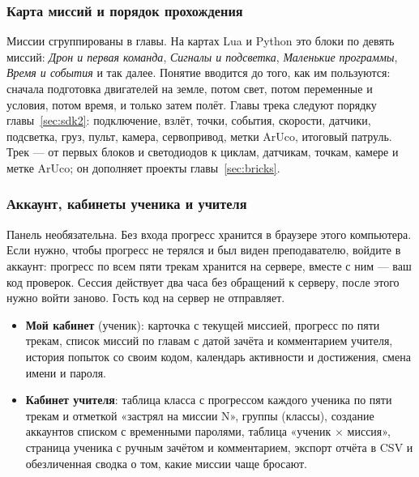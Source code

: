 \subsubsection{Карта миссий и порядок прохождения}

\begin{center}
\end{center}

\begin{center}
\end{center}

Миссии сгруппированы в главы. На картах Lua и Python это блоки по девять миссий: \textit{Дрон и первая команда}, \textit{Сигналы и подсветка}, \textit{Маленькие программы}, \textit{Время и события} и так далее. Понятие вводится до того, как им пользуются: сначала подготовка двигателей на земле, потом свет, потом переменные и условия, потом время, и только затем полёт. Главы трека  следуют порядку главы~\ref{sec:sdk2}: подключение, взлёт, точки, события, скорости, датчики, подсветка, груз, пульт, камера, сервопривод, метки ArUco, итоговый патруль. Трек  --- от первых блоков и светодиодов к циклам, датчикам, точкам, камере и метке ArUco; он дополняет проекты главы~\ref{sec:bricks}.

\subsubsection{Аккаунт, кабинеты ученика и учителя}

Панель  необязательна. Без входа прогресс хранится в браузере этого компьютера. Если нужно, чтобы прогресс не терялся и был виден преподавателю, войдите в аккаунт: прогресс по всем пяти трекам хранится на сервере, вместе с ним --- ваш код проверок. Сессия действует два часа без обращений к серверу, после этого нужно войти заново. Гость код на сервер не отправляет.

\begin{itemize}
    \item \textbf{Мой кабинет} (ученик): карточка  с текущей миссией, прогресс по пяти трекам, список миссий по главам с датой зачёта и комментарием учителя, история попыток со своим кодом, календарь активности и достижения, смена имени и пароля.
    \item \textbf{Кабинет учителя}: таблица класса с прогрессом каждого ученика по пяти трекам и отметкой «застрял на миссии N», группы (классы), создание аккаунтов списком с временными паролями, таблица «ученик $\times$ миссия», страница ученика с ручным зачётом и комментарием, экспорт отчёта в CSV и обезличенная сводка о том, какие миссии чаще бросают.
\end{itemize}

